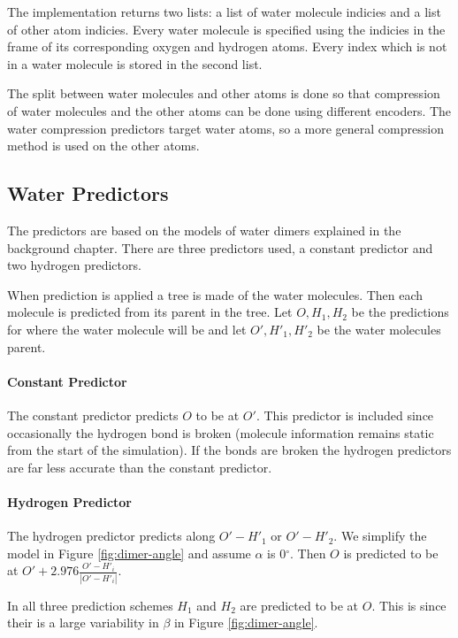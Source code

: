 \documentclass[a4paper]{report}
\newcommand{\degree}{\ensuremath{^\circ}}
\begin{document}
The implementation returns two lists: a list of water molecule indicies and a
list of other atom indicies. Every water molecule is specified using the
indicies in the frame of its corresponding oxygen and hydrogen atoms. Every
index which is not in a water molecule is stored in the second list.

The split between water molecules and other atoms is done so that compression
of water molecules and the other atoms can be done using different
encoders. The water compression predictors target water atoms, so a more
general compression method is used on the other atoms.


\subsection{Water Predictors}
\label{sec:water-predictors}

The predictors are based on the models of water dimers explained in the
background chapter. There are three predictors used, a constant predictor and
two hydrogen predictors.

When prediction is applied a tree is made of the water molecules. Then each
molecule is predicted from its parent in the tree. Let $O, H_1, H_2$ be the
predictions for where the water molecule will be and let $O', H'_1, H'_2$ be
the water molecules parent.

\paragraph{Constant Predictor}
The constant predictor predicts $O$ to be at $O'$. This predictor is included
since occasionally the hydrogen bond is broken (molecule information remains
static from the start of the simulation). If the bonds are broken the hydrogen
predictors are far less accurate than the constant predictor.

\paragraph{Hydrogen Predictor}
The hydrogen predictor predicts along $O'-H'_1$ or $O'-H'_2$. We simplify the
model in Figure \ref{fig:dimer-angle} and assume $\alpha$ is $0\degree$. Then
$O$ is predicted to be at $O' + 2.976\frac{O'-H'_i}{|O'-H'_i|}$.

In all three prediction schemes $H_1$ and $H_2$ are predicted to be at
$O$. This is since their is a large variability in $\beta$ in Figure
\ref{fig:dimer-angle}.
\end{document}

